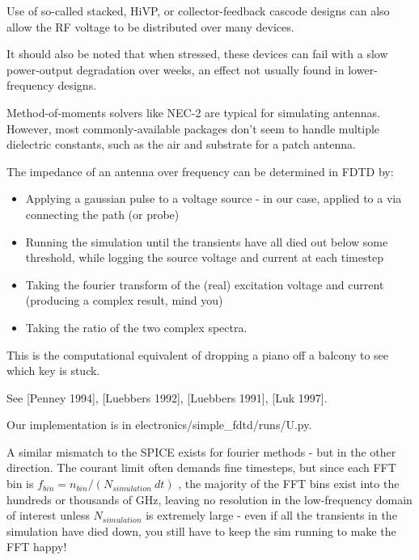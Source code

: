 \documentclass[paper.tex]{subfiles}
\begin{document}
Use of so-called stacked, HiVP, or collector-feedback cascode designs can also allow the RF voltage to be distributed over many devices.

It should also be noted that when stressed, these devices can fail with a slow power-output degradation over weeks, an effect not usually found in lower-frequency designs. 







\clearpage
{}

Method-of-moments solvers like NEC-2 are typical for simulating antennas. However, most commonly-available packages don't seem to handle multiple dielectric constants, such as the air and substrate for a patch antenna.

The impedance of an antenna over frequency can be determined in FDTD by:

\begin{itemize}
  \item Applying a gaussian pulse to a voltage source - in our case, applied to a via connecting the path (or probe)
  \item Running the simulation until the transients have all died out below some threshold, while logging the source voltage and current at each timestep
  \item Taking the fourier transform of the (real) excitation voltage and current (producing a complex result, mind you)
  \item Taking the ratio of the two complex spectra.
\end{itemize}

This is the computational equivalent of dropping a piano off a balcony to see which key is stuck.

See [Penney 1994], [Luebbers 1992], [Luebbers 1991], [Luk 1997]. 

Our implementation is in electronics/simple\_fdtd/runs/U.py.

A similar mismatch to the SPICE exists for fourier methods - but in the other direction.  The courant limit often demands fine timesteps, but since each FFT bin is $ f_{bin} = n_{bin} / (N_{simulation} \ dt) $ , the majority of the FFT bins exist into the hundreds or thousands of GHz, leaving no resolution in the low-frequency domain of interest unless $N_{simulation}$ is extremely large - even if all the transients in the simulation have died down, you still have to keep the sim running to make the FFT happy! 
\end{document}
